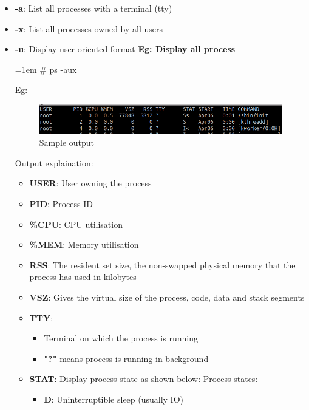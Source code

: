 \begin{flushleft}
\begin{itemize}
\begin{itemize}
			\item \textbf{-a}: List all processes with a terminal (tty)
			\item \textbf{-x}: List all processes owned by all users
			\item \textbf{-u}: Display user-oriented format
			\newline
			\textbf{Eg: Display all process}
			\bigskip
			\begin{tcolorbox}[breakable,notitle,boxrule=-0pt,colback=black,colframe=black]
				\color{green}
				\font=1em
				\# ps -aux
				\font=4pt
			\end{tcolorbox}
			Eg: 
			\begin{figure}[h!]
				\centering
				\includegraphics[scale=.35]{content/chapter12/images/ps.png}
				\caption{Sample output}
				\label{fig:process234}
			\end{figure}
			\newline
			Output explaination:
			\begin{itemize}
				\item \textbf{USER}: User owning the process
				\item \textbf{PID}: Process ID
				\item \textbf{\%CPU}: CPU utilisation
				\item \textbf{\%MEM}: Memory utilisation
				\item \textbf{RSS}: The resident set size, the non-swapped physical memory that the process has used in kilobytes
				\item \textbf{VSZ}: Gives the virtual size of the process, code, data and stack segments
				\item \textbf{TTY}: 
				\begin{itemize}
					\item Terminal on which the process is running
					\item \textbf{"?"} means process is running in background
				\end{itemize}
				\item \textbf{STAT}: Display process state as shown below:
					\newline
					 Process states:
					\begin{itemize}
						\item \textbf{D}: Uninterruptible sleep (usually IO)

\end{itemize}
\end{itemize}
\end{itemize}
\end{itemize}
\end{flushleft}
